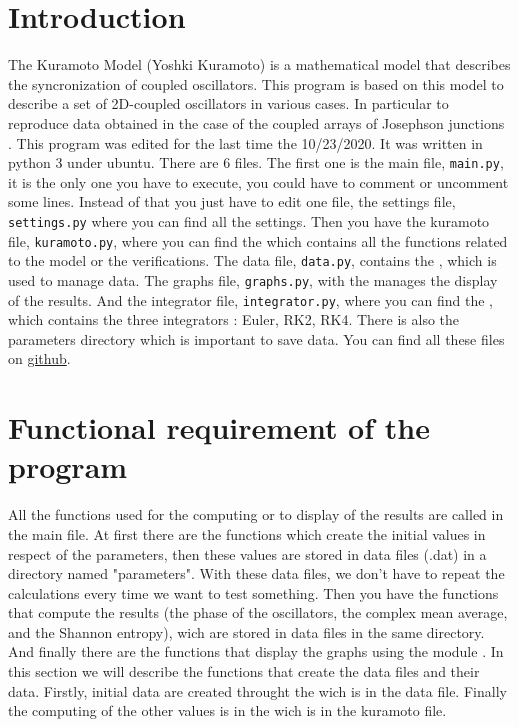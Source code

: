 \documentclass[1pt, a4paper]{article}
\begin{document}
\maketitlepage
\tableofcontents
\newpage
\section{Introduction}
\label{sec:1}
\noindent
The Kuramoto Model (Yoshki Kuramoto) is a mathematical model that describes the syncronization of coupled oscillators. This program is based on this model to describe a set of 2D-coupled oscillators in various cases. In particular to reproduce data obtained in the case of the coupled arrays of Josephson junctions \cite{josephson}. This program was edited for the last time the 10/23/2020. It was written in python 3 under ubuntu. There are 6 files. The first one is the main file, \texttt{main.py}, it is the only one you have to execute, you could have to comment or uncomment some lines. Instead of that you just have to edit one file, the settings file, \texttt{settings.py} where you can find all the settings. Then you have the kuramoto file, \texttt{kuramoto.py}, where you can find the  which contains all the functions related to the model or the verifications. The data file, \texttt{data.py}, contains the , which is used to manage data. The graphs file, \texttt{graphs.py}, with the  manages the display of the results. And the integrator file, \texttt{integrator.py}, where you can find the , which contains the three integrators : Euler, RK2, RK4. There is also the parameters directory which is important to save data. You can find all these files on \href{https://github.com/faucheresse/swimming_pool/tree/main/prog}{github}.
\section{Functional requirement of the program}
\label{sec:2}
\noindent
All the functions used for the computing or to display of the results are called in the main file. At first there are the functions which create the initial values in respect of the parameters, then these values are stored in data files (.dat) in a directory named "parameters". With these data files, we don't have to repeat the calculations every time we want to test something. Then you have the functions that compute the results (the phase of the oscillators, the complex mean average, and the Shannon entropy), wich are stored in data files in the same directory. And finally there are the functions that display the graphs using the module . In this section we will describe the functions that create the data files and their data. Firstly, initial data are created throught the  wich is in the data file. Finally the computing of the other values is in the  wich is in the kuramoto file.
\end{document}
